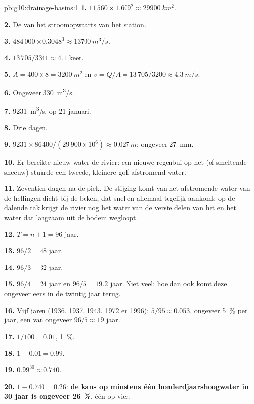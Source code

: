 \begin{solution}{pb:g10:drainage-basins:1}
\textbf{1.} $11\,560 \times 1.609^2 \approx \qty{29900}{km^2}$.

\textbf{2.} De  van het  stroomopwaarts van het station.

\textbf{3.} $484\,000 \times 0.3048^3 \approx \qty{13700}{m^3/s}$.

\textbf{4.} $13\,705/3341 \approx 4.1$ keer.

\textbf{5.} $A = 400 \times 8 = \qty{3200}{m^2}$ en $v = Q/A = 13\,705/3200
\approx \qty{4.3}{m/s}$.

\textbf{6.} Ongeveer \qty{330}{m^3/s}.

\textbf{7.} \qty{9231}{m^3/s}, op 21 januari.

\textbf{8.} Drie dagen.

\textbf{9.} $9231 \times 86\,400/(29\,900 \times 10^6) \approx
\qty{0.027}{m}$: ongeveer \qty{27}{mm}.

\textbf{10.} Er bereikte nieuw water de rivier: een nieuwe regenbui op het
 (of smeltende sneeuw) stuurde een tweede, kleinere golf afstromend
water.

\textbf{11.} Zeventien dagen na de piek. De stijging komt van het afstromende
water van de hellingen dicht bij de beken, dat snel en allemaal tegelijk
aankomt; op de dalende tak krijgt de rivier nog het water van de verste delen van
het  en het water dat langzaam uit de bodem wegloopt.

\textbf{12.} $T = n + 1 = 96$ jaar.

\textbf{13.} $96/2 = 48$ jaar.

\textbf{14.} $96/3 = 32$ jaar.

\textbf{15.} $96/4 = 24$ jaar en $96/5 = 19.2$ jaar. Niet veel: hoe dan ook komt
deze  ongeveer eens in de twintig jaar terug.

\textbf{16.} Vijf jaren (1936, 1937, 1943, 1972 en 1996): $5/95 \approx
0.053$, ongeveer \qty{5}{\percent} per jaar, een  van ongeveer
$96/5 \approx 19$ jaar.

\textbf{17.} $1/100 = 0.01$, \qty{1}{\percent}.

\textbf{18.} $1 - 0.01 = 0.99$.

\textbf{19.} $0.99^{30} \approx 0.740$.

\textbf{20.} $1 - 0.740 = 0.26$: \textbf{de kans op minstens één
honderdjaarshoogwater in 30 jaar is ongeveer \qty{26}{\percent}}, één op vier.
\end{solution}
